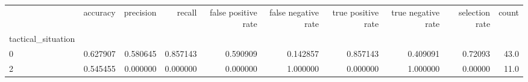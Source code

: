 \begin{tabular}{lrrrrrrrrr}
\toprule
{} &  accuracy &  precision &    recall &  false positive rate &  false negative rate &  true positive rate &  true negative rate &  selection rate &  count \\
tactical\_situation &           &            &           &                      &                      &                     &                     &                 &        \\
\midrule
0                  &  0.627907 &   0.580645 &  0.857143 &             0.590909 &             0.142857 &            0.857143 &            0.409091 &         0.72093 &   43.0 \\
2                  &  0.545455 &   0.000000 &  0.000000 &             0.000000 &             1.000000 &            0.000000 &            1.000000 &         0.00000 &   11.0 \\
\bottomrule
\end{tabular}
